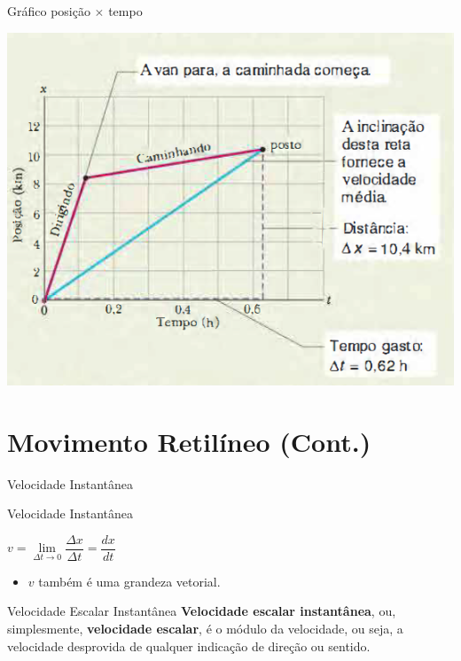 \documentclass[xcolor=dvipsnames,table]{beamer}
\begin{document}
	\begin{frame}{Gráfico posição $\times$ tempo}
		\begin{center}
			\includegraphics[scale=0.5]{images/fig2-5}
		\end{center}
	\end{frame}

\section{Movimento Retilíneo (Cont.)}
	\begin{frame}{Velocidade Instantânea}
		\begin{block}{Velocidade Instantânea}
			\begin{center}
				$v = \underset{\Delta t\rightarrow 0}{\lim} \dfrac{\Delta x}{\Delta t} = \dfrac{dx}{dt}$
			\end{center} \pause
			\begin{itemize}
				\item $v$ também é uma grandeza vetorial.
			\end{itemize}
		\end{block} \pause
		\begin{block}{Velocidade Escalar Instantânea}
			{\bf Velocidade escalar instantânea}, ou, simplesmente, {\bf velocidade escalar}, é o módulo da velocidade, ou seja, a velocidade desprovida de qualquer indicação de direção ou sentido.
		\end{block}
	\end{frame}
\end{document}
